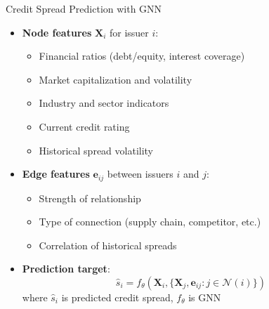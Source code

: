 \documentclass{beamer}
\begin{document}
\begin{frame}{Credit Spread Prediction with GNN}
\begin{itemize}
    \item \textbf{Node features} $\mathbf{X}_i$ for issuer $i$:
    \begin{itemize}
        \item Financial ratios (debt/equity, interest coverage)
        \item Market capitalization and volatility
        \item Industry and sector indicators
        \item Current credit rating
        \item Historical spread volatility
    \end{itemize}
    \item \textbf{Edge features} $\mathbf{e}_{ij}$ between issuers $i$ and $j$:
    \begin{itemize}
        \item Strength of relationship
        \item Type of connection (supply chain, competitor, etc.)
        \item Correlation of historical spreads
    \end{itemize}
    \item \textbf{Prediction target}:
    \begin{equation}
    \hat{s}_i = f_{\theta}(\mathbf{X}_i, \{\mathbf{X}_j, \mathbf{e}_{ij} : j \in \mathcal{N}(i)\})
    \end{equation}
    where $\hat{s}_i$ is predicted credit spread, $f_{\theta}$ is GNN
\end{itemize}
\end{frame}
\end{document}
